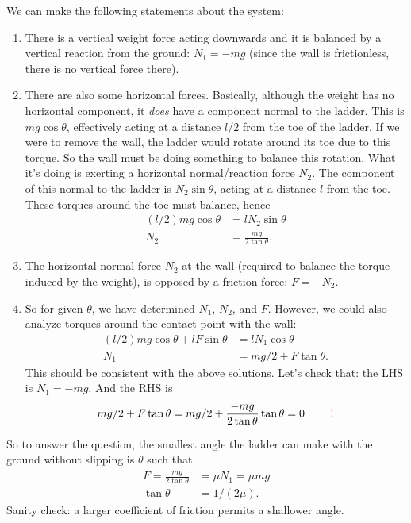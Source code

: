We can make the following statements about the system:
\begin{enumerate}
\item There is a vertical weight force acting downwards and it is balanced by a vertical reaction
  from the ground: $N_1 = -mg$ (since the wall is frictionless, there is no vertical force there).
\item There are also some horizontal forces. Basically, although the weight has no horizontal
  component, it \emph{does} have a component normal to the ladder. This is $mg\cos\theta$,
  effectively acting at a distance $l/2$ from the toe of the ladder. If we were to remove the wall,
  the ladder would rotate around its toe due to this torque. So the wall must be doing something to
  balance this rotation. What it's doing is exerting a horizontal normal/reaction force $N_2$. The
  component of this normal to the ladder is $N_2\sin\theta$, acting at a distance $l$ from the
  toe. These torques around the toe must balance, hence
  \begin{align*}
    (l/2)mg\cos\theta &= lN_2\sin\theta \\
    N_2               &= \frac{mg}{2\tan\theta}.
  \end{align*}
\item The horizontal normal force $N_2$ at the wall (required to balance the torque induced by the
  weight), is opposed by a friction force: $F = -N_2$.
\item So for given $\theta$, we have determined $N_1$, $N_2$, and $F$. However, we could also
  analyze torques around the contact point with the wall:
  \begin{align*}
    (l/2)mg\cos\theta + lF\sin\theta &= lN_1\cos\theta \\
    N_1                              &= mg/2  + F\tan\theta.
  \end{align*}
  This should be consistent with the above solutions. Let's check that: the LHS is $N_1 = -mg$. And
  the RHS is
  \begin{align*}
  mg/2 + F\tan\theta = mg/2 + \frac{-mg}{2\tan\theta}\tan\theta = 0 ~~~~~~~\textcolor{red}{!}
  \end{align*}
\end{enumerate}


So to answer the question, the smallest angle the ladder can make with the ground without slipping
is $\theta$ such that
\begin{align*}
  F = \frac{mg}{2\tan\theta} &= \mu N_1 = \mu m g \\
  \tan\theta                 &= 1/(2\mu).
\end{align*}
Sanity check: a larger coefficient of friction permits a shallower angle.


